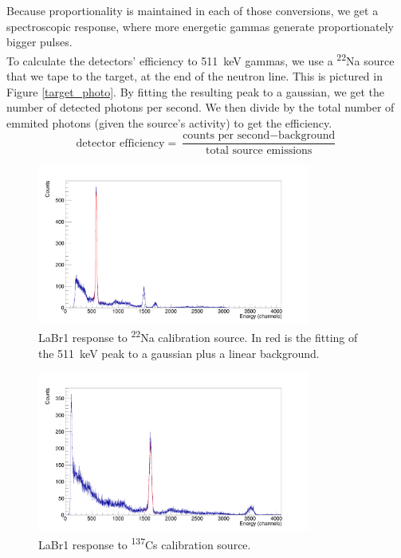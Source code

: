 \documentclass[a4paper,12pt]{report}
\newcommand{\Na}{\textsuperscript{22}Na }
\begin{document}
Because proportionality is maintained in each of those conversions, we get a spectroscopic response, where more energetic gammas generate proportionately bigger pulses.
\\

To calculate the detectors' efficiency to \qty{511}{\keV} gammas, we use a \Na source that we tape to the target, at the end of the neutron line.
This is pictured in Figure \ref{target_photo}.
By fitting the resulting peak to a gaussian, we get the number of detected photons per second.
We then divide by the total number of emmited photons (given the source's activity) to get the efficiency.
\begin{equation}
	\text{detector efficiency} = \frac{\text{counts per second}-\text{background}}{\text{total source emissions}}
\end{equation}

\begin{figure}[H]
	\centering
	\includegraphics[width=0.80\textwidth]{labr_na22_calibration.png}
	\caption{LaBr1 response to \Na calibration source. In red is the fitting of the \qty{511}{\keV} peak to a gaussian plus a linear background.}
	\label{labr_na22_calibration}
\end{figure}

\begin{figure}[H]
	\centering
	\includegraphics[width=0.80\textwidth]{labr_cs137_calibration.png}
	\caption{LaBr1 response to \textsuperscript{137}Cs calibration source.}
	\label{labr_cs137_calibration}
\end{figure}
\end{document}
